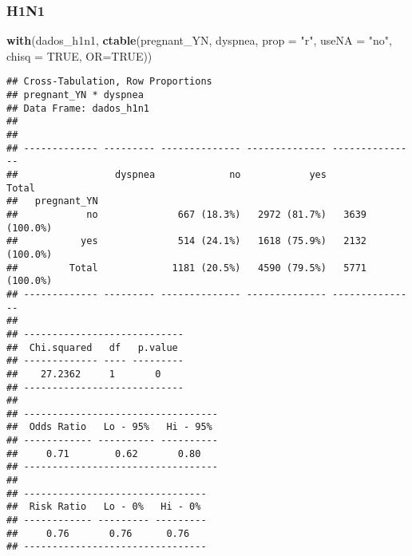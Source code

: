 \documentclass[
]{article}
\newenvironment{Shaded}{\begin{snugshade}}{\end{snugshade}}
\newcommand{\DataTypeTok}[1]{\textcolor[rgb]{0.13,0.29,0.53}{#1}}
\newcommand{\DecValTok}[1]{\textcolor[rgb]{0.00,0.00,0.81}{#1}}
\newcommand{\KeywordTok}[1]{\textcolor[rgb]{0.13,0.29,0.53}{\textbf{#1}}}
\newcommand{\NormalTok}[1]{#1}
\newcommand{\OperatorTok}[1]{\textcolor[rgb]{0.81,0.36,0.00}{\textbf{#1}}}
\newcommand{\OtherTok}[1]{\textcolor[rgb]{0.56,0.35,0.01}{#1}}
\newcommand{\StringTok}[1]{\textcolor[rgb]{0.31,0.60,0.02}{#1}}
\begin{document}
\hypertarget{h1n1-13}{%
\subsubsection{H1N1}\label{h1n1-13}}

\begin{Shaded}
\end{Shaded}

\begin{Shaded}
\begin{Highlighting}[]
\KeywordTok{with}\NormalTok{(dados_h1n1, }\KeywordTok{ctable}\NormalTok{(pregnant_YN, dyspnea, }\DataTypeTok{prop =} \StringTok{"r"}\NormalTok{, }\DataTypeTok{useNA =} \StringTok{"no"}\NormalTok{, }\DataTypeTok{chisq =} \OtherTok{TRUE}\NormalTok{, }\DataTypeTok{OR=}\OtherTok{TRUE}\NormalTok{))}
\end{Highlighting}
\end{Shaded}

\begin{verbatim}
## Cross-Tabulation, Row Proportions  
## pregnant_YN * dyspnea  
## Data Frame: dados_h1n1  
## 
## 
## ------------- --------- -------------- -------------- ---------------
##                 dyspnea             no            yes           Total
##   pregnant_YN                                                        
##            no              667 (18.3%)   2972 (81.7%)   3639 (100.0%)
##           yes              514 (24.1%)   1618 (75.9%)   2132 (100.0%)
##         Total             1181 (20.5%)   4590 (79.5%)   5771 (100.0%)
## ------------- --------- -------------- -------------- ---------------
## 
## ----------------------------
##  Chi.squared   df   p.value 
## ------------- ---- ---------
##    27.2362     1       0    
## ----------------------------
## 
## ----------------------------------
##  Odds Ratio   Lo - 95%   Hi - 95% 
## ------------ ---------- ----------
##     0.71        0.62       0.80   
## ----------------------------------
## 
## --------------------------------
##  Risk Ratio   Lo - 0%   Hi - 0% 
## ------------ --------- ---------
##     0.76       0.76      0.76   
## --------------------------------
\end{verbatim}
\end{document}
